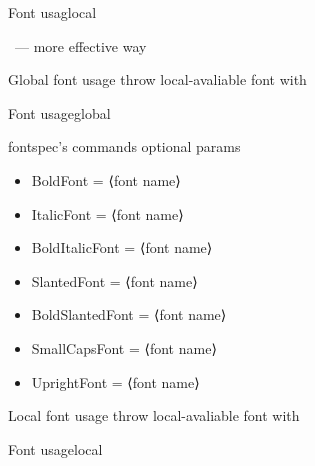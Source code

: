 \begin{frame}[fragile]{Font usag\magicPagee}{local}\relax

\ccol\newfontfamily\ --- more effective way

\end{frame}

\begin{frame}
     \centering\huge Global font usage throw local-avaliable font with \XeLaTeX
\end{frame}
\begin{frame}[fragile]{Font usage}{global}\relax

\ccol{}

\end{frame}

\begin{frame}[fragile]{fontspec's commands optional params\magicPage}\relax
\begin{itemize}
    \item BoldFont = ⟨font name⟩
\item ItalicFont = ⟨font name⟩
\item BoldItalicFont = ⟨font name⟩
\item SlantedFont = ⟨font name⟩
\item BoldSlantedFont = ⟨font name⟩
\item SmallCapsFont = ⟨font name⟩
\item UprightFont = ⟨font name⟩
\end{itemize}
     
\end{frame}

\begin{frame}\magicPage
     \centering\huge Local font usage throw local-avaliable font with \XeLaTeX
\end{frame}

\begin{frame}[fragile]{Font usage\magicPage}{local}\relax

\ccol{}

\end{frame}

